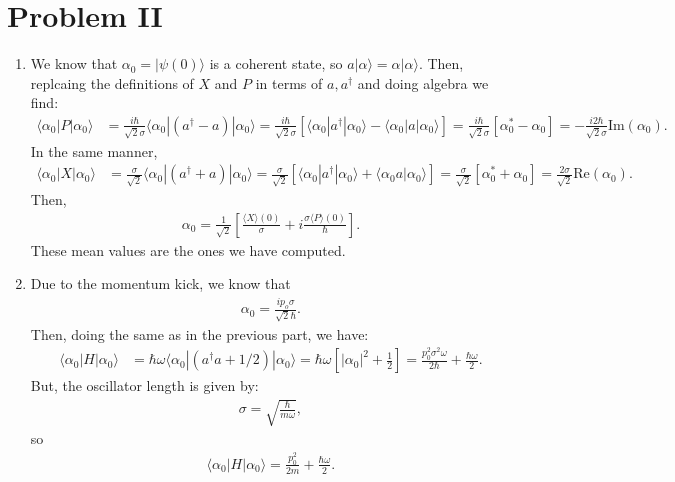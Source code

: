 \documentclass[letterpaper,11pt,twoside]{article}
\newcommand{\ket}[1]{|#1\rangle}
\newcommand{\braket}[1]{\langle#1\rangle}
\newcommand{\re}[1]{\text{Re}\left(#1\right)}
\newcommand{\im}[1]{\text{Im}\left(#1\right)}
\begin{document}
\section*{Problem II}
\begin{enumerate}[itemsep=0pt,topsep=0pt,label=\alph*)]
  \item We know that $\alpha_0=\ket{\psi(0)}$ is a coherent state, so $a\ket{\alpha}=\alpha\ket{\alpha}$. Then, replcaing the definitions of $X$ and $P$ in terms of $a,a^\dagger$ and doing algebra we find:
  \begin{align*}
    \braket{\alpha_0|P|\alpha_0}&=\frac{i\hbar}{\sqrt{2}\sigma}\braket{\alpha_0|(a^\dagger-a)|\alpha_0}=\frac{i\hbar}{\sqrt{2}\sigma}\left[\braket{\alpha_0|a^\dagger|\alpha_0}-\braket{\alpha_0|a|\alpha_0}\right]=\frac{i\hbar}{\sqrt{2}\sigma}\left[\alpha_0^*-\alpha_0\right]=-\frac{i2\hbar}{\sqrt{2}\sigma}\im{\alpha_0}.
  \end{align*} 
  In the same manner,
  \begin{align*}
    \braket{\alpha_0|X|\alpha_0}&=\frac{\sigma}{\sqrt{2}}\braket{\alpha_0|(a^\dagger+a)|\alpha_0}=\frac{\sigma}{\sqrt{2}}\left[\braket{\alpha_0|a^\dagger|\alpha_0}+\braket{\alpha_0a|\alpha_0}\right]=\frac{\sigma}{\sqrt{2}}[\alpha_0^*+\alpha_0]=\frac{2\sigma}{\sqrt{2}}\re{\alpha_0}.
  \end{align*}
  Then,
  \begin{align*}
    \alpha_0=\frac{1}{\sqrt{2}}\left[\frac{\braket{X}(0)}{\sigma}+i\frac{\sigma\braket{P}(0)}{\hbar}\right].
  \end{align*}
  These mean values are the ones we have computed.
  \item Due to the momentum kick, we know that 
  \begin{align*}
    \alpha_0=\frac{ip_o\sigma}{\sqrt{2}\hbar}.
  \end{align*}
  Then, doing the same as in the previous part, we have:
  \begin{align*}
    \braket{\alpha_0|H|\alpha_0}&=\hbar\omega\braket{\alpha_0|(a^\dagger a+1/2)|\alpha_0}=\hbar\omega\left[|\alpha_0|^2+\frac{1}{2}\right]=\frac{p_0^2\sigma^2\omega}{2\hbar}+\frac{\hbar\omega}{2}.
  \end{align*}
  But, the oscillator length is given by:
  \begin{align*}
    \sigma=\sqrt{\frac{\hbar}{m\omega}},
  \end{align*}
  so
  \begin{align*}
    \braket{\alpha_0|H|\alpha_0}=\frac{p_0^2}{2m}+\frac{\hbar\omega}{2}.
  \end{align*}

\end{enumerate}
\end{document}
